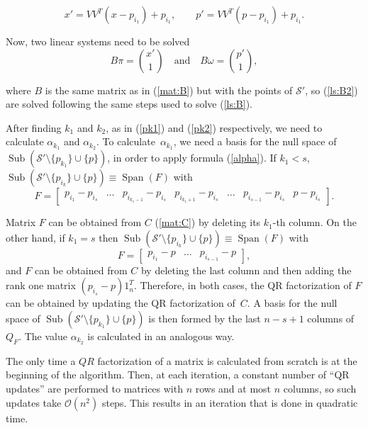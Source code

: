 $$x' = VV^T(x-p_{i_1})+p_{i_1},\quad \quad {{p}}' = VV^T({{p}}-p_{i_1})+p_{i_1}.$$

\noindent Now, two linear systems need to be solved
\begin{equation}\label{ls:B2}
B\pi = \binom{x'}{1}\quad\text{and}\quad B\omega = \binom{{{p}}'}{1},
\end{equation}

\noindent where $B$ is the same matrix as in (\ref{mat:B}) but with the points of ${\mathcal{S}}'$, so (\ref{ls:B2}) are solved following the same steps used to solve (\ref{ls:B}).

After finding $k_1$ and $k_2$, as in (\ref{pk1}) and (\ref{pk2}) respectively, we need to calculate $\alpha_{k_1}$ and $\alpha_{k_2}$. To calculate~$\alpha_{k_1}$, we need a basis for the null space of ${\operatorname{Sub}}({\mathcal{S}}'\setminus\{p_{k_1}\}\cup \{{{p}}\})$, in order to apply formula (\ref{alpha}). If $k_1<s$, ${\operatorname{Sub}}({\mathcal{S}}'\setminus\{p_{i_k}\}\cup \{{{p}}\})\equiv {\operatorname{Span}}(F)$ with
$$F=\left[\begin{array}{ccccccc}\label{mat:F}
p_{i_1}-p_{i_s}& \dots &p_{i_{k_1-1}}-p_{i_s}&p_{i_{k_1+1}}-p_{i_s}&\dots& p_{i_{s-1}}-p_{i_s} & {{p}} - p_{i_s}
\end{array}\right].$$

\noindent Matrix $F$ can be obtained from $C$ (\ref{mat:C}) by deleting its $k_1$-th column. On the other hand, if $k_1=s$ then	${\operatorname{Sub}}({\mathcal{S}}'\setminus\{p_{i_k}\}\cup \{{{p}}\})\equiv {\operatorname{Span}}(F)$ with
$$F=\left[\begin{array}{ccc}\label{mat:F2}
p_{i_1}-{{p}}& \dots & p_{i_{s-1}}-{{p}}
\end{array}\right],$$
\noindent and $F$ can be obtained from $C$ by deleting the last column and then adding the rank one matrix $(p_{i_{s}}-{{p}})1_n^T$. Therefore, in both cases, the QR factorization of $F$ can be obtained by updating the QR factorization of~$C$. A basis for the null space of ${\operatorname{Sub}}({\mathcal{S}}'\setminus\{p_{k_1}\}\cup \{{{p}}\})$ is then formed by the  last $n-s+1$ columns of~$Q_F$. The value $\alpha_{k_2}$ is calculated in an analogous way.

\medskip

The only time a $QR$ factorization of a matrix is calculated from scratch is at the beginning of the algorithm. Then, at each iteration, a constant number of ``QR updates'' are performed to matrices with $n$ rows and at most $n$ columns, so such updates take ${\mathcal{O}}(n^2)$ steps. This results in an iteration that is done in quadratic time.

